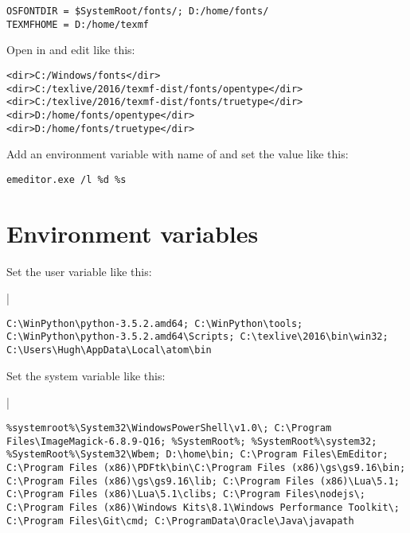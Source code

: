 \documentclass{hzguide}
\begin{document}
\begin{Reference}
\begin{verbatim}
OSFONTDIR = $SystemRoot/fonts/; D:/home/fonts/
TEXMFHOME = D:/home/texmf 
\end{verbatim}
\end{Reference}

Open  in  and edit like this:

\begin{Reference}
\begin{verbatim}
<dir>C:/Windows/fonts</dir>
<dir>C:/texlive/2016/texmf-dist/fonts/opentype</dir>
<dir>C:/texlive/2016/texmf-dist/fonts/truetype</dir>
<dir>D:/home/fonts/opentype</dir>  
<dir>D:/home/fonts/truetype</dir>  
\end{verbatim}
\end{Reference}

Add an environment variable with name of  and set the value like this:

\begin{Reference}
\begin{verbatim}
emeditor.exe /l %d %s
\end{verbatim}
\end{Reference}

\section{Environment variables}

Set the  user variable like this:

\begin{Reference}|
\begin{verbatim}
C:\WinPython\python-3.5.2.amd64; C:\WinPython\tools; C:\WinPython\python-3.5.2.amd64\Scripts; C:\texlive\2016\bin\win32; C:\Users\Hugh\AppData\Local\atom\bin
\end{verbatim}
\end{Reference}

Set the  system variable like this:

\begin{Reference}|
\begin{verbatim}
%systemroot%\System32\WindowsPowerShell\v1.0\; C:\Program Files\ImageMagick-6.8.9-Q16; %SystemRoot%; %SystemRoot%\system32; %SystemRoot%\System32\Wbem; D:\home\bin; C:\Program Files\EmEditor; C:\Program Files (x86)\PDFtk\bin\C:\Program Files (x86)\gs\gs9.16\bin; C:\Program Files (x86)\gs\gs9.16\lib; C:\Program Files (x86)\Lua\5.1; C:\Program Files (x86)\Lua\5.1\clibs; C:\Program Files\nodejs\; C:\Program Files (x86)\Windows Kits\8.1\Windows Performance Toolkit\; C:\Program Files\Git\cmd; C:\ProgramData\Oracle\Java\javapath
\end{verbatim}
\end{Reference}
\end{document}
